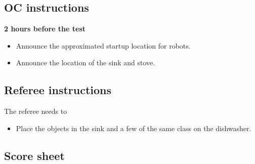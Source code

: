 \subsection{OC instructions}

\textbf{2 hours before the test}
\begin{itemize}
    \item Announce the approximated startup location for robots.
    \item Announce the location of the sink and stove.
\end{itemize}

\subsection{Referee instructions}
The referee needs to
\begin{itemize}
	\item Place the objects in the sink and a few of the same class on the dishwasher. 
\end{itemize}


\newpage
\subsection{Score sheet}


